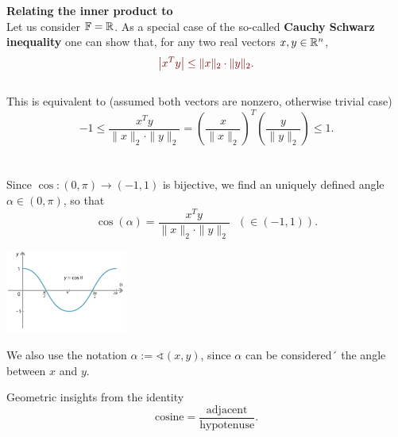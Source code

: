 \begin{frame} 
	\textbf{Relating the inner product to }~\\\vspace{0.2cm}
	Let us consider ${\mathbb{F}}={\mathbb{R}}$. As a special case of the so-called \textbf{Cauchy Schwarz inequality} one can show that, for any two real vectors $x,y\in {\mathbb{R}}^n$, 
	\begin{equation*}\label{eq:cauchyschwarz_l2} \color{satzrot}
	\left|x^Ty\right|\le \|x\|_2\cdot\|y\|_2.
	\end{equation*}
	~\\
	This is equivalent to (assumed both vectors are nonzero, otherwise trivial case)
	\begin{equation*}
	-1 \leq \frac{x^Ty}{\|x\|_2\cdot\|y\|_2} = \left(\frac{x }{\|x\|_2 }\right)^T \left(\frac{y}{\|y\|_2}\right) \leq 1.
	\end{equation*}
	~\\~\\
	Since $\cos\colon (0, \pi) \to (-1,1)$ is bijective, we find an uniquely defined angle $\alpha \in (0, \pi)$, so that
	$$\cos(\alpha) = \frac{x^Ty}{\|x\|_2\cdot\|y\|_2} ~~~\left(\in (-1,1)\right). $$
	\begin{center}
		\includegraphics[width = 0.3\textwidth]{media/cosine}
	\end{center}
{\color{defgruen}We also use the notation $\alpha:=\sphericalangle(x,y)$}, since $\alpha$ can be considered´ the angle between $x$ and $y$.	
\end{frame}

\begin{frame}
	
		Geometric insights from the identity 
		$$\text{cosine} = \frac{\text{adjacent}}{\text{hypotenuse}} .$$
\end{frame}



